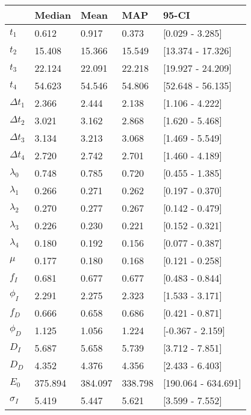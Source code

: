 \begin{tabular}{lllll}
\toprule
{} &   Median &     Mean &      MAP &                95-CI \\
\midrule
$t_1$        &    0.612 &    0.917 &    0.373 &      [0.029 - 3.285] \\
$t_2$        &   15.408 &   15.366 &   15.549 &    [13.374 - 17.326] \\
$t_3$        &   22.124 &   22.091 &   22.218 &    [19.927 - 24.209] \\
$t_4$        &   54.623 &   54.546 &   54.806 &    [52.648 - 56.135] \\
$\Delta t_1$ &    2.366 &    2.444 &    2.138 &      [1.106 - 4.222] \\
$\Delta t_2$ &    3.021 &    3.162 &    2.868 &      [1.620 - 5.468] \\
$\Delta t_3$ &    3.134 &    3.213 &    3.068 &      [1.469 - 5.549] \\
$\Delta t_4$ &    2.720 &    2.742 &    2.701 &      [1.460 - 4.189] \\
$\lambda_0$  &    0.748 &    0.785 &    0.720 &      [0.455 - 1.385] \\
$\lambda_1$  &    0.266 &    0.271 &    0.262 &      [0.197 - 0.370] \\
$\lambda_2$  &    0.270 &    0.277 &    0.267 &      [0.142 - 0.479] \\
$\lambda_3$  &    0.226 &    0.230 &    0.221 &      [0.152 - 0.321] \\
$\lambda_4$  &    0.180 &    0.192 &    0.156 &      [0.077 - 0.387] \\
$\mu$        &    0.177 &    0.180 &    0.168 &      [0.121 - 0.258] \\
$f_I$        &    0.681 &    0.677 &    0.677 &      [0.483 - 0.844] \\
$\phi_I$     &    2.291 &    2.275 &    2.323 &      [1.533 - 3.171] \\
$f_D$        &    0.666 &    0.658 &    0.686 &      [0.421 - 0.871] \\
$\phi_D$     &    1.125 &    1.056 &    1.224 &     [-0.367 - 2.159] \\
$D_I$        &    5.687 &    5.658 &    5.739 &      [3.712 - 7.851] \\
$D_D$        &    4.352 &    4.376 &    4.356 &      [2.433 - 6.403] \\
$E_0$        &  375.894 &  384.097 &  338.798 &  [190.064 - 634.691] \\
$\sigma_I$   &    5.419 &    5.447 &    5.621 &      [3.599 - 7.552] \\

\end{tabular}
